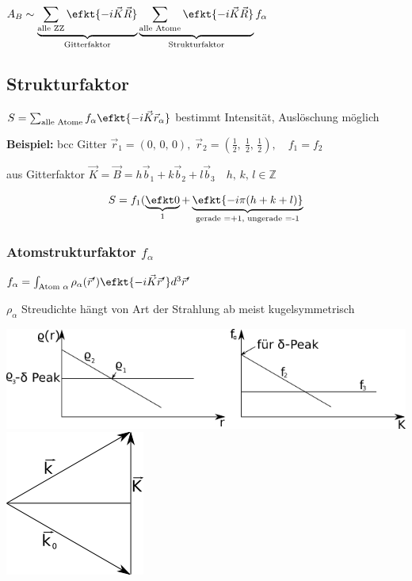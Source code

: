 \nr

$A_{B}\sim\underbrace{\sum_{\text{alle ZZ}}\efkt{-i\vec{K}\vec{R}}}_{\text{Gitterfaktor}}\underbrace{\sum_{\text{alle Atome}}\efkt{-i\vec{K}\vec{R}}}_{\text{Strukturfaktor}}f_{\alpha}$

\subsection{Strukturfaktor}

$S=\sum_{\text{alle Atome}}f_{\alpha}\efkt{-i\vec{K}\vec{r}_{\alpha}}$
bestimmt Intensit\"at, Ausl\"oschung m\"oglich

\textbf{Beispiel:} bcc Gitter $\vec{r}_{1}=(0,\,0,\,0),\;\vec{r}_{2}=\left(\frac{1}{2},\:\frac{1}{2},\,\frac{1}{2}\right),\quad f_{1}=f_{2}$

aus Gitterfaktor $\vec{K}=\vec{B}=h\vec{b}_{1}+k\vec{b}_{2}+l\vec{b}_{3}\quad h,\, k,\, l\in\mathbb{Z}$

\[
S=f_{1}(\underbrace{\efkt 0}_{1}+\underbrace{\efkt{-i\pi(h+k+l)}}_{\text{gerade =+1, ungerade =-1}}\]



\subsubsection{Atomstrukturfaktor $f_{\alpha}$}

$f_{\alpha}=\int_{\text{Atom }\alpha}\rho_{\alpha}(\vec{r}^{\prime})\efkt{-i\vec{K}\vec{r}^{\prime}}\text{\ensuremath{d^{3}}}\vec{r}^{\prime}$ 

$\rho_{\alpha}$ Streudichte h\"angt von Art der Strahlung ab meist
kugelsymmetrisch

\includegraphics[scale=1]{images/2009-11-05-streugraphen.png}
\includegraphics[scale=1]{images/2009-11-05-streu-winkel.png}

